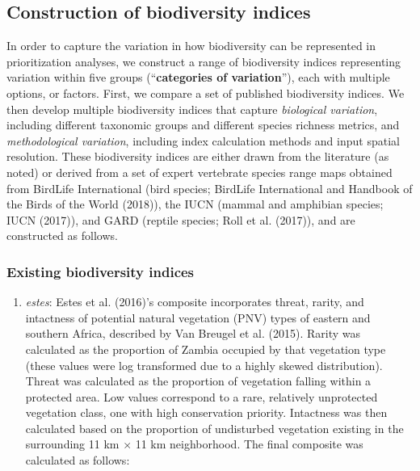\documentclass[
]{article}
\providecommand{\tightlist}{%
  \setlength{\itemsep}{0pt}\setlength{\parskip}{0pt}}
\begin{document}
\hypertarget{bd-inputs}{%
\subsection{Construction of biodiversity indices}\label{bd-inputs}}

In order to capture the variation in how biodiversity can be represented in prioritization analyses, we construct a range of biodiversity indices representing variation within five groups (``\textbf{categories of variation}''), each with multiple options, or factors. First, we compare a set of published biodiversity indices. We then develop multiple biodiversity indices that capture \emph{biological variation}, including different taxonomic groups and different species richness metrics, and \emph{methodological variation}, including index calculation methods and input spatial resolution. These biodiversity indices are either drawn from the literature (as noted) or derived from a set of expert vertebrate species range maps obtained from BirdLife International (bird species; BirdLife International and Handbook of the Birds of the World (2018)), the IUCN (mammal and amphibian species; IUCN (2017)), and GARD (reptile species; Roll et al. (2017)), and are constructed as follows.

\hypertarget{existing-biodiversity-indices}{%
\subsubsection{Existing biodiversity indices}\label{existing-biodiversity-indices}}

\begin{enumerate}
\def\labelenumi{(\arabic{enumi})}
\tightlist
\item
  \emph{estes}: Estes et al. (2016)'s composite incorporates threat, rarity, and intactness of potential natural vegetation (PNV) types of eastern and southern Africa, described by Van Breugel et al. (2015). Rarity was calculated as the proportion of Zambia occupied by that vegetation type (these values were log transformed due to a highly skewed distribution). Threat was calculated as the proportion of vegetation falling within a protected area. Low values correspond to a rare, relatively unprotected vegetation class, one with high conservation priority. Intactness was then calculated based on the proportion of undisturbed vegetation existing in the surrounding 11 km \(\times\) 11 km neighborhood. The final composite was calculated as follows:
\end{enumerate}
\end{document}
